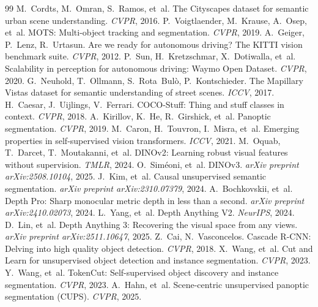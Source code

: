 \documentclass{article}
\begin{document}
\begin{thebibliography}{99}
 M.~Cordts, M.~Omran, S.~Ramos, et~al. The Cityscapes dataset for semantic urban scene understanding. \emph{CVPR}, 2016.
 P.~Voigtlaender, M.~Krause, A.~Osep, et~al. MOTS: Multi-object tracking and segmentation. \emph{CVPR}, 2019.
 A.~Geiger, P.~Lenz, R.~Urtasun. Are we ready for autonomous driving? The KITTI vision benchmark suite. \emph{CVPR}, 2012.
 P.~Sun, H.~Kretzschmar, X.~Dotiwalla, et~al. Scalability in perception for autonomous driving: Waymo Open Dataset. \emph{CVPR}, 2020.
 G.~Neuhold, T.~Ollmann, S.~Rota~Bul\`o, P.~Kontschieder. The Mapillary Vistas dataset for semantic understanding of street scenes. \emph{ICCV}, 2017.
 H.~Caesar, J.~Uijlings, V.~Ferrari. COCO-Stuff: Thing and stuff classes in context. \emph{CVPR}, 2018.
 A.~Kirillov, K.~He, R.~Girshick, et~al. Panoptic segmentation. \emph{CVPR}, 2019.
 M.~Caron, H.~Touvron, I.~Misra, et~al. Emerging properties in self-supervised vision transformers. \emph{ICCV}, 2021.
 M.~Oquab, T.~Darcet, T.~Moutakanni, et~al. DINOv2: Learning robust visual features without supervision. \emph{TMLR}, 2024.
 O.~Sim\'eoni, et~al. DINOv3. \emph{arXiv preprint arXiv:2508.10104}, 2025.
 J.~Kim, et~al. Causal unsupervised semantic segmentation. \emph{arXiv preprint arXiv:2310.07379}, 2024.
 A.~Bochkovskii, et~al. Depth Pro: Sharp monocular metric depth in less than a second. \emph{arXiv preprint arXiv:2410.02073}, 2024.
 L.~Yang, et~al. Depth Anything V2. \emph{NeurIPS}, 2024.
 D.~Lin, et~al. Depth Anything 3: Recovering the visual space from any views. \emph{arXiv preprint arXiv:2511.10647}, 2025.
 Z.~Cai, N.~Vasconcelos. Cascade R-CNN: Delving into high quality object detection. \emph{CVPR}, 2018.
 X.~Wang, et~al. Cut and Learn for unsupervised object detection and instance segmentation. \emph{CVPR}, 2023.
 Y.~Wang, et~al. TokenCut: Self-supervised object discovery and instance segmentation. \emph{CVPR}, 2023.
 A.~Hahn, et~al. Scene-centric unsupervised panoptic segmentation (CUPS). \emph{CVPR}, 2025.

\end{thebibliography}
\end{document}
